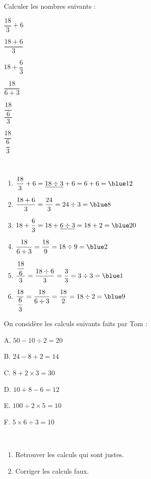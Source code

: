 \documentclass[nocrop]{sesamanuel_college_5e_new}
\begin{document}
\begin{colonne*exercice}
\bigskip


\begin{exercice} %
   Calculer les nombres suivants :
   \begin{colenumerate}{3}
      \item $\dfrac{18}{3}+6$ \bigskip
      \item $\dfrac{18+6}{3}$
      \item $18+\dfrac{6}{3}$
      \item $\dfrac{18}{6+3}$
      \item $\dfrac{\dfrac{18}{6}}{3}$
      \item $\dfrac{18}{\dfrac{6}{3}}$
   \end{colenumerate}
\end{exercice}

\begin{corrige}
   \ \\ [-5mm]
   \begin{enumerate}
      \item $\dfrac{18}{3}+6 =\underline{18\div3}+6 =6+6 =\blue 12$ \medskip
      \item $\dfrac{18+6}{3} =\dfrac{24}{3} =24\div3 =\blue 8$ \medskip
      \item $18+\dfrac{6}{3} =18+\underline{6\div3} =18+2 =\blue 20$ \medskip
      \item $\dfrac{18}{6+3} =\dfrac{18}{9} =18\div9 =\blue 2$ \medskip
      \item $\dfrac{\dfrac{18}{6}}{3} =\dfrac{18\div6}{3} =\dfrac{3}{3} =3\div3 =\blue 1$ \medskip
      \item $\dfrac{18}{\dfrac{6}{3}} =\dfrac{18}{6\div3} =\dfrac{18}{2} =18\div2 =\blue 9$
   \end{enumerate}
\end{corrige}

\bigskip


\begin{exercice} %
   On considère les calculs suivants faits par Tom :
   \begin{colitemize}{2}
      \item A. \;$50-10\div2 =20$ \smallskip
      \item B. \;$24-8+2 =14$ \smallskip
      \item C. \;$8+2\times3 =30$
      \item D. \;$10+8-6 =12$
      \item E. \;$100\div2\times5 =10$
      \item F. \;$5\times6\div3 =10$
   \end{colitemize}
   \  \\ [-10mm]
   \begin{enumerate}
      \item Retrouver les calculs qui sont justes.
      \item Corriger les calculs faux.
   \end{enumerate}
\end{exercice}


\end{colonne*exercice}
\end{document}
